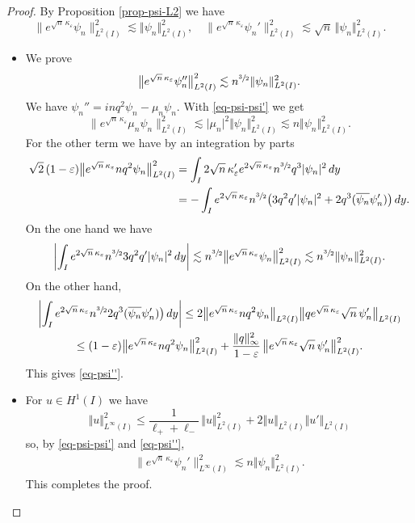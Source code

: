 \documentclass[JEP,XML,SOM,Unicode]{cedram}
\theoremstyle{plain}
\theoremstyle{definition}
\newcommand{\abs}[1]{\vert #1\vert}
\newcommand{\bbabs}[1]{\biggl\vert #1\biggr\vert}
\newcommand{\nr}[1]{\Vert #1\Vert}
\newcommand{\1}{\mathds 1}
\let\Re\relax
\DeclareMathOperator{\Re}{\mathsf{Re}\mkern2mu}
\let\e\varepsilon
\let\k\kappa
\begin{document}
\begin{proof}
By Proposition \ref{prop-psi-L2} we have
\begin{equation} \label{eq-psi-psi'}
\big\|e^{\sqrt n\,\kappa_\e} \psi_n\big\|_{L^2(I)}^2 \lesssim \nr{\psi_n}_{L^2(I)}^2, \quad
\big\|e^{\sqrt n\,\kappa_\e} \psi_n'\big\|_{L^2(I)}^2 \lesssim \sqrt n\,\nr{\psi_n}_{L^2(I)}^2.
\end{equation}

\begin{itemize}
\item
We prove
\begin{equation} \label{eq-psi''}
\big\|e^{\sqrt n\,\kappa_\e} \psi_n''\big\|_{L^2(I)}^2 \lesssim n^{\sfrac 32} \nr{\psi_n}_{L^2(I)}^2.
\end{equation}
We have $\psi_n'' = inq^2 \psi_n - \mu_n \psi_n$. With \eqref{eq-psi-psi'} we get
\[
\big\| e^{\sqrt n\,\kappa_\e} \mu_n \psi_n \big\|_{L^2(I)}^2 \lesssim \abs{\mu_n}^2 \nr{\psi_n}_{L^2(I)}^2 \lesssim n \nr{\psi_n}_{L^2(I)}^2.
\]
For the other term we have by an integration by parts
\begin{align*}
\sqrt 2\, (1-\e) \big\| e^{\sqrt n\,\kappa_\e} n q^2 \psi_n \big\|_{L^2(I)}^2
& = \int_I 2 \sqrt n\,\k_\e' e^{2 \sqrt n\,\kappa_\e} n^{\sfrac 32} q^3 \abs{\psi_n}^2 \, dy\\
& = -\int_I e^{2 \sqrt n\,\kappa_\e} n^{\sfrac 32} \bigl(3 q^2 q' \abs{\psi_n}^2 + 2 q^3 \Re(\overline{\psi_n} \psi_n') \bigr) \, dy.
\end{align*}
On the one hand we have
\[
\bbabs{\int_I e^{2 \sqrt n\,\kappa_\e} n^{\sfrac 32} 3 q^2 q' \abs{\psi_n}^2 \, dy} \lesssim n^{\sfrac 32} \big\| e^{\sqrt n\,\kappa_\e} \psi_n \big\|_{L^2(I)}^2 \lesssim n^{\sfrac 32} \nr{\psi_n}_{L^2(I)}^2.
\]
On the other hand,
\begin{multline*}
\bbabs{\int_I e^{2 \sqrt n\,\kappa_\e} n^{\sfrac 32} 2 q^3 \Re(\overline{\psi_n} \psi_n') \bigr) \, dy} \leq 2 \big\|e^{\sqrt n\,\kappa_\e} n q^2 \psi_n\big\|_{L^2(I)} \big\| q e^{\sqrt n\,\kappa_\e} \sqrt n\,\psi_n'\big\|_{L^2(I)}\\
\leq (1-\e) \big\|e^{\sqrt n\,\kappa_\e} n q^2 \psi_n\big\|_{L^2(I)}^2 + \frac {\nr{q}_\infty^2}{1-\e}\, \big\|e^{\sqrt n\,\kappa_\e} \sqrt n\,\psi_n'\big\|_{L^2(I)}^2.
\end{multline*}
This gives \eqref{eq-psi''}.

\item
For $u \in H^1(I)$ we have
\[
\nr{u}_{L^\infty(I)}^2 \leq \frac{1}{\ell_+ +\ell_-}\, \nr{u}_{L^2(I)}^2 + 2 \nr{u}_{L^2(I)}\nr{u'}_{L^2(I)}
\]
so, by \eqref{eq-psi-psi'} and \eqref{eq-psi''},
\begin{align*}
\big\|e^{\sqrt n\,\kappa_\e} \psi_n'\big\|_{L^\infty(I)}^2
\lesssim n \nr{\psi_n}_{L^2(I)}^2.
\end{align*}
This completes the proof.\qedhere
\end{itemize}
\end{proof}
\end{document}
